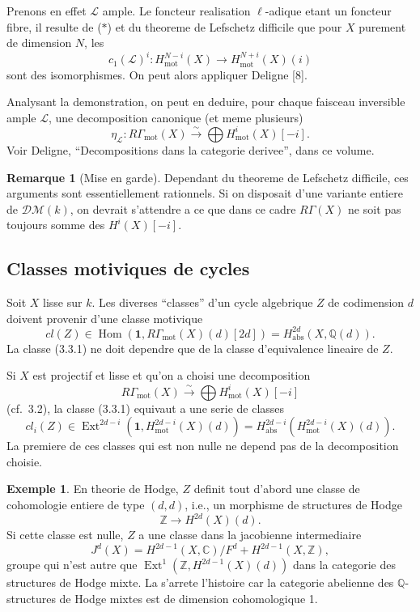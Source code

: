 \documentclass[11pt,a4paper]{article}
\theoremstyle{plain}
\theoremstyle{definition}
\newtheorem{example}[theorem]{Exemple}
\newtheorem{remark}[theorem]{Remarque}
\DeclareMathOperator{\Ext}{Ext}
\DeclareMathOperator{\Hom}{Hom}
\newcommand{\Q}{\mathbb{Q}}
\newcommand{\Z}{\mathbb{Z}}
\newcommand{\C}{\mathbb{C}}
\DeclareMathOperator{\mot}{mot}
\newcommand{\abs}{\mathrm{abs}}
\begin{document}
Prenons en effet $\mathscr{L}$ ample. Le foncteur realisation $\ell$-adique etant un foncteur fibre, il resulte de ($*$) et du theoreme de Lefschetz difficile que pour $X$ purement de dimension $N$, les
$$
c_1(\mathscr{L})^i: H^{N-i}_{\mot}(X) \to H^{N+i}_{\mot}(X)(i)
$$
sont des isomorphismes. On peut alors appliquer Deligne [8].

Analysant la demonstration, on peut en deduire, pour chaque faisceau inversible ample $\mathscr{L}$, une decomposition canonique (et meme plusieurs)
$$
\eta_{\mathscr{L}}: R\Gamma_{\mot}(X) \xrightarrow{\sim} \bigoplus H^i_{\mot}(X)[-i].
$$
Voir Deligne, ``Decompositions dans la categorie derivee'', dans ce volume.

\begin{remark}[Mise en garde]
Dependant du theoreme de Lefschetz difficile, ces arguments sont essentiellement rationnels. Si on disposait d'une variante entiere de $\mathscr{D}\mathcal{M}(k)$, on devrait s'attendre a ce que dans ce cadre $R\Gamma(X)$ ne soit pas toujours somme des $H^i(X)[-i]$.
\end{remark}

\subsection{Classes motiviques de cycles}

Soit $X$ lisse sur $k$. Les diverses ``classes'' d'un cycle algebrique $Z$ de codimension $d$ doivent provenir d'une classe motivique
\begin{equation}
\tag{3.3.1}
cl(Z) \in \Hom(\mathbf{1}, R\Gamma_{\mot}(X)(d)[2d]) = H^{2d}_{\abs}(X, \Q(d)).
\end{equation}
La classe (3.3.1) ne doit dependre que de la classe d'equivalence lineaire de $Z$.

Si $X$ est projectif et lisse et qu'on a choisi une decomposition
\begin{equation}
\tag{$*$}
R\Gamma_{\mot}(X) \xrightarrow{\sim} \bigoplus H^i_{\mot}(X)[-i]
\end{equation}
(cf.~3.2), la classe (3.3.1) equivaut a une serie de classes
\begin{equation}
\tag{3.3.2}
cl_i(Z) \in \Ext^{2d-i}(\mathbf{1}, H^{2d-i}_{\mot}(X)(d)) = H^{2d-i}_{\abs}(H^{2d-i}_{\mot}(X)(d)).
\end{equation}
La premiere de ces classes qui est non nulle ne depend pas de la decomposition choisie.

\begin{example}
En theorie de Hodge, $Z$ definit tout d'abord une classe de cohomologie entiere de type $(d, d)$, i.e., un morphisme de structures de Hodge
$$
\Z \to H^{2d}(X)(d).
$$
Si cette classe est nulle, $Z$ a une classe dans la jacobienne intermediaire
$$
J^d(X) = H^{2d-1}(X, \C) / F^d + H^{2d-1}(X, \Z),
$$
groupe qui n'est autre que $\Ext^1(\Z, H^{2d-1}(X)(d))$ dans la categorie des structures de Hodge mixte. La s'arrete l'histoire car la categorie abelienne des $\Q$-structures de Hodge mixtes est de dimension cohomologique 1.
\end{example}
\end{document}
